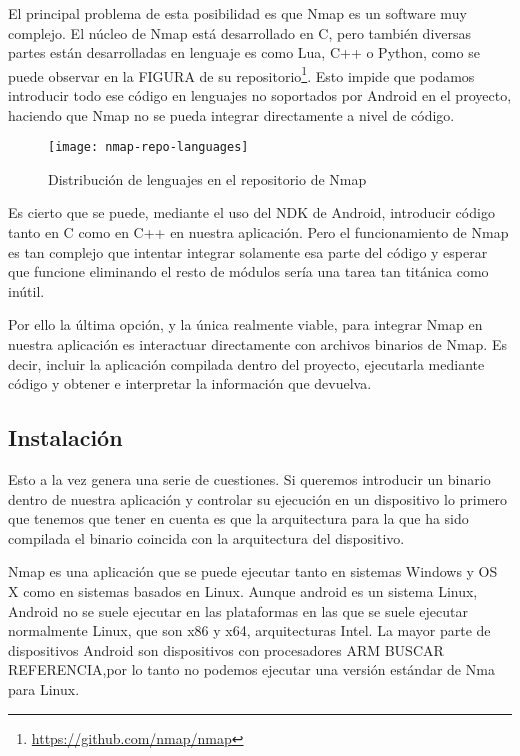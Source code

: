 El principal problema de esta posibilidad es que Nmap es un software muy complejo. El núcleo de Nmap está desarrollado en C, pero también diversas partes están desarrolladas en lenguaje es como Lua, C++ o Python, como se puede observar en la FIGURA de su repositorio\footnote{\url{https://github.com/nmap/nmap}}. Esto impide que podamos introducir todo ese código en lenguajes no soportados por Android en el proyecto, haciendo que Nmap no se pueda integrar directamente a nivel de código.

\begin{figure}[H]
	\centering
	\texttt{[image: nmap-repo-languages]}
	\caption{Distribución de lenguajes en el repositorio de Nmap}
	\label{fig:nmap-repo-languages}
\end{figure}

Es cierto que se puede, mediante el uso del NDK de Android, introducir código tanto en C como en C++ en nuestra aplicación. Pero el funcionamiento de Nmap es tan complejo que intentar integrar solamente esa parte del código y esperar que funcione eliminando el resto de módulos sería una tarea tan titánica como inútil.

Por ello la última opción, y la única realmente viable, para integrar Nmap en nuestra aplicación es interactuar directamente con archivos binarios de Nmap. Es decir, incluir la aplicación compilada dentro del proyecto, ejecutarla mediante código y obtener e interpretar la información que devuelva.

\subsection{Instalación}

Esto a la vez genera una serie de cuestiones. Si queremos introducir un binario dentro de nuestra aplicación y controlar su ejecución en un dispositivo lo primero que tenemos que tener en cuenta es que la arquitectura para la que ha sido compilada el binario coincida con la arquitectura del dispositivo.

Nmap  es una aplicación que se puede ejecutar tanto en sistemas Windows y OS X como en sistemas basados en Linux. Aunque android es un sistema Linux, Android no se suele ejecutar en las plataformas en las que se suele ejecutar normalmente Linux, que son x86 y x64, arquitecturas Intel. La mayor parte de dispositivos Android son dispositivos con procesadores ARM BUSCAR REFERENCIA,por lo tanto no podemos  ejecutar una versión estándar de Nma para Linux.

